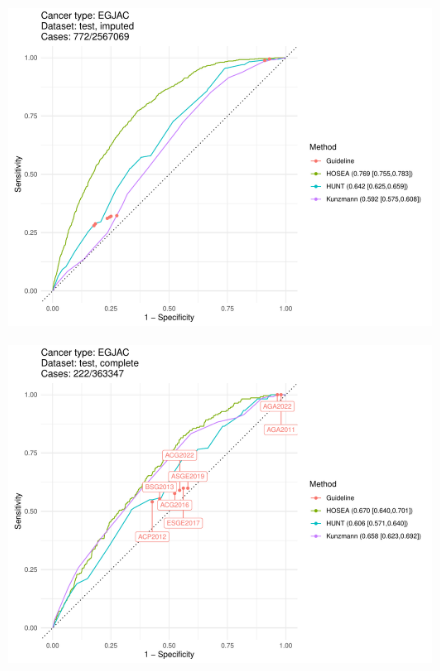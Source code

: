 \documentclass[12pt]{article}
\begin{document}
\begin{figure}[ht]
\includegraphics[width=1.0\linewidth]{comparison/EGJAC_imputed.pdf}
\end{figure}

\begin{figure}[ht]
\includegraphics[width=1.0\linewidth]{comparison/EGJAC_complete.pdf}
\end{figure}
\end{document}
